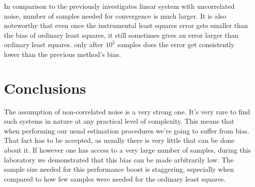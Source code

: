 In comparison to the previously investigates linear system with uncorrelated noise, number of samples needed for convergence is much larger. It is also noteworthy that even once the instrumental least squares error gets smaller than the bias of ordinary least squares, it still sometimes gives an error larger than ordinary least squares. only after $10^5$ samples does the error get consistently lower than the previous method's bias.


\clearpage
\section{Conclusions}

The assumption of non-correlated noise is a very strong one. It's very rare to find such systems in nature at any practical level of complexity. This means that when performing our usual estimation procedures we're going to suffer from bias. That fact has to be accepted, as usually there is very little that can be done about it. If however one has access to a very large number of samples, during this laboratory we demonstrated that this bias can be made arbitrarily low. The sample size needed for this performance boost is staggering, especially when compared to how few samples were needed for the ordinary least squares.
